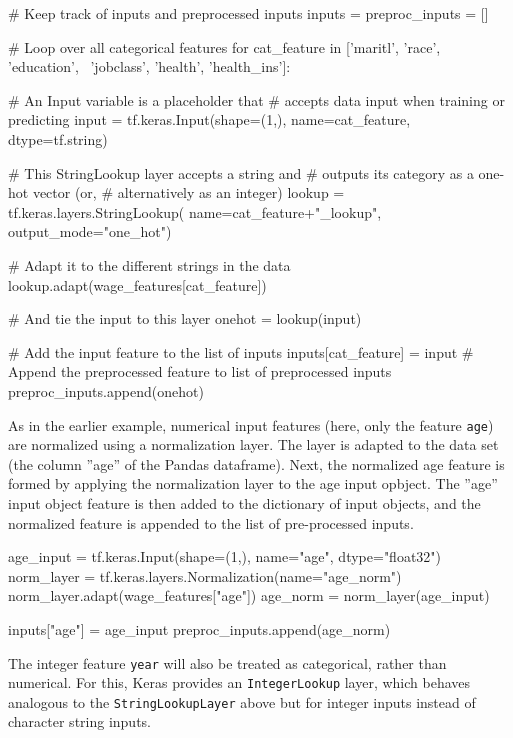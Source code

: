 \begin{pythoncode}
# Keep track of inputs and preprocessed inputs
inputs = {}
preproc_inputs = []

# Loop over all categorical features
for cat_feature in ['maritl', 'race', 'education', \
                    'jobclass', 'health', 'health_ins']:
               
    # An Input variable is a placeholder that
    # accepts data input when training or predicting
    input = tf.keras.Input(shape=(1,), 
       name=cat_feature, dtype=tf.string)
    
    # This StringLookup layer accepts a string and 
    # outputs its category as a one-hot vector (or, 
    # alternatively as an integer)
    lookup = tf.keras.layers.StringLookup(
        name=cat_feature+"_lookup", output_mode="one_hot")

    # Adapt it to the different strings in the data
    lookup.adapt(wage_features[cat_feature])
    
    # And tie the input to this layer
    onehot = lookup(input)
    
    # Add the input feature to the list of inputs
    inputs[cat_feature] = input
    # Append the preprocessed feature to list of preprocessed inputs
    preproc_inputs.append(onehot)
\end{pythoncode}

As in the earlier example, numerical input features (here, only the feature \texttt{age}) are normalized using a normalization layer. The layer is adapted to the data set (the column ''age'' of the Pandas dataframe). Next, the normalized age feature is formed by applying the normalization layer to the age input opbject. The ''age'' input object feature is then added to the dictionary of input objects, and the normalized feature is appended to the list of pre-processed inputs. 

\begin{pythoncode}
age_input = tf.keras.Input(shape=(1,), name="age", dtype="float32")
norm_layer = tf.keras.layers.Normalization(name="age_norm")
norm_layer.adapt(wage_features["age"])
age_norm = norm_layer(age_input)

inputs["age"] = age_input
preproc_inputs.append(age_norm)
\end{pythoncode}

The integer feature \texttt{year} will also be treated as categorical, rather than numerical. For this, Keras provides an \texttt{IntegerLookup} layer, which behaves analogous to the \texttt{StringLookupLayer} above but for integer inputs instead of character string inputs.

